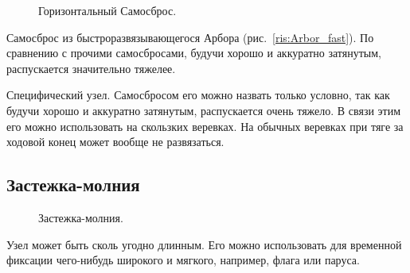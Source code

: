 \begin{figure}[H]\centering
	\subfloat[Завязывание]{\label{ris:Arbor_fast_samosbros_1_1}
	\tcbox[enhanced jigsaw,colframe=black,opacityframe=0.5,opacityback=0.5,height=5cm]
		{\centering
			}
		}
\hfil
	\subfloat[Результат]{\label{ris:Arbor_fast_samosbros_1_2}
	\tcbox[enhanced jigsaw,colframe=black,opacityframe=0.5,opacityback=0.5,height=5cm]
		{\centering
			}
		}
\hfil
\hfil
	\caption{Горизонтальный Самосброс.}\label{ris:Arbor_fast_samosbros}
\end{figure}

Самосброс из быстроразвязывающегося Арбора (рис.~\ref{ris:Arbor_fast}). По сравнению с прочими самосбросами, будучи хорошо и аккуратно затянутым, распускается значительно тяжелее.

Специфический узел. Самосбросом его можно назвать только условно, так как будучи хорошо и аккуратно затянутым, распускается очень тяжело. В связи этим его можно использовать на скользких веревках. На обычных веревках при тяге за ходовой конец может вообще не развязаться.

\subsection{Застежка-молния}

\begin{figure}[H]\centering
	\begin{minipage}{1\linewidth}
		\begin{center}
			\tcbox[enhanced jigsaw,colframe=black,opacityframe=0.5,opacityback=0.5]
			{\centering{}}
		\end{center}
	\end{minipage}
\caption{Застежка-молния.}
\label{ris:Latching}
\end{figure}

Узел может быть сколь угодно длинным. Его можно использовать для временной фиксации чего-нибудь широкого и мягкого, например, флага или паруса.
